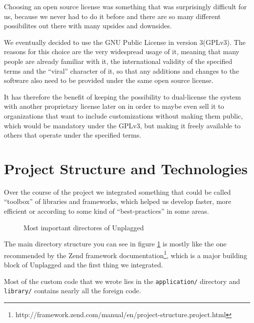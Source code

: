 Choosing an open source license was something that was surprisingly difficult for us,
because we never had to do it before and there are so many different possibilites out there with many upsides and downsides.

We eventually decided to use the GNU Public License in version 3(GPLv3). The reasons for this choice are the very widespread usage of it, meaning that many people are already 
familiar with it, the international validity of the specified terms and the \enquote{viral}
character of it, so that any additions and changes to the software also need to be provided 
under the same open source license.

It has therefore the benefit of keeping the possibility to dual-license the system with another proprietary license later on in order to maybe even sell it to organizations that want to include
customizations without making them public, which would be mandatory under the GPLv3, but making it freely available to others that operate under the specified terms.

\section{Project Structure and Technologies}

Over the course of the project we integrated something that could be called \enquote{toolbox} of libraries and frameworks, which 
helped us develop faster, more efficient or according to some kind of \enquote{best-practices}
in some areas.

\begin{figure}[!h]
\caption{Most important directores of Unplagged}
  \label{fig:directoryStructure}
\end{figure}

The main directory structure you can see in figure \ref{fig:directoryStructure} is mostly like the one recommended by the Zend framework documentation\footnote{http://framework.zend.com/manual/en/project-structure.project.html}, which is a major building block of 
Unplagged and the first thing we integrated.

Most of the custom code that we wrote lies in the \texttt{application/} directory and \texttt{library/} contains nearly all the foreign code.

